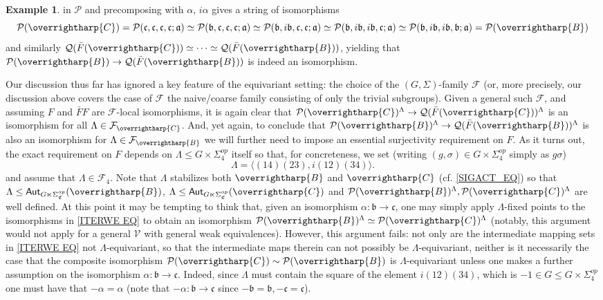 \documentclass[a4paper,10pt
,draft
]{article}%
\numberwithin{equation}{section}
\numberwithin{figure}{section}
\theoremstyle{definition} %
\newtheorem{example}[equation]{Example}%
\newcommand{\vect}[1]{\text{\overrightharp{\ensuremath{#1}}}}
\newcommand{\F}{\ensuremath{\mathcal F}}
\newcommand{\V}{\ensuremath{\mathcal V}}
\renewcommand{\P}{\ensuremath{\mathcal P}}
\newcommand{\1}{\ensuremath{\mathbbm 1}}%
\begin{document}
\begin{example}
in $\P$ and precomposing  
with $\alpha$, $i \alpha$ gives a string of isomorphisms
\begin{equation}\label{ITERWE EQ}
\P(\vect{C})
=
\P(\mathfrak{c},\mathfrak{c},\mathfrak{c},\mathfrak{c};\mathfrak{a})
\simeq 
\P(\mathfrak{b},\mathfrak{c},\mathfrak{c},\mathfrak{c};\mathfrak{a})
\simeq
\P(\mathfrak{b},i\mathfrak{b},\mathfrak{c},\mathfrak{c};\mathfrak{a})
\simeq
\P(\mathfrak{b},i\mathfrak{b},i\mathfrak{b},\mathfrak{c};\mathfrak{a})
\simeq
\P(\mathfrak{b},i\mathfrak{b},i\mathfrak{b},\mathfrak{b};\mathfrak{a})
=
\P(\vect{B})
\end{equation}
and similarly
$\mathcal{Q}(\bar{F}(\vect{C})) 
\simeq
\cdots 
\simeq
\mathcal{Q}(\bar{F}(\vect{B}))
$,
yielding that
$\P(\vect{B}) \to \mathcal{Q}(\bar{F}(\vect{B}))$
is indeed an isomorphism.

Our discussion thus far has ignored a key feature of the equivariant setting: the choice of the $(G,\Sigma)$-family $\F$
(or, more precisely, our discussion above covers the case of $\F$ the naive/coarse family consisting of only the trivial subgroups).
Given a general such $\F$, 
and assuming $F$ and $\bar{F} F$ are $\F$-local isomorphisms,
it is again clear that
$\P(\vect{C})^{\Lambda} \to \mathcal{Q}(\bar{F}(\vect{C}))^{\Lambda}$
is an isomorphism for all $\Lambda \in \F_{\vect{C}}$.
And, yet again, to conclude that
$\P(\vect{B})^{\Lambda} \to \mathcal{Q}(\bar{F}(\vect{B}))^{\Lambda}$
is also an isomorphism for $\Lambda \in \F_{\vect{B}}$ we will further need to impose an essential surjectivity requirement on $F$.
As it turns out, the exact requirement on $F$ depends on 
$\Lambda \leq G \times \Sigma_4^{op}$ itself so that, for concreteness, we set (writing $(g,\sigma) \in G \times \Sigma_4^{op}$ simply as $g\sigma$)
\[
\Lambda = \langle (14)(23), i (12)(34) \rangle.
\]
and assume that $\Lambda \in \F_4$.
Note that $\Lambda$ stabilizes both 
$\vect{B}$ and $\vect{C}$
(cf. \eqref{SIGACT_EQ})
so that 
$\Lambda \leq \mathsf{Aut}_{G \ltimes \Sigma^{op}_{\mathfrak{C}}}(\vect{B})$,
$\Lambda \leq \mathsf{Aut}_{G \ltimes \Sigma^{op}_{\mathfrak{C}}}(\vect{C})$
and $\P(\vect{B})^{\Lambda}, \P(\vect{C})^{\Lambda}$
are well defined.
At this point it may be tempting to think that, 
given an isomorphism 
$\alpha \colon \mathfrak{b} \to \mathfrak{c}$,
one may simply apply $\Lambda$-fixed points 
to the isomorphisms in \eqref{ITERWE EQ}
to obtain an isomorphism 
$\P(\vect{B})^{\Lambda} \simeq \P(\vect{C})^{\Lambda}$
(notably, this argument would not apply for a general $\V$
with general weak equivalences).
%
However, this argument fails: not only are the intermediate mapping sets
in \eqref{ITERWE EQ} not $\Lambda$-equivariant, so that the intermediate maps therein can not possibly be $\Lambda$-equivariant,
neither is it necessarily the case that the composite isomorphism
$\P(\vect{C}) \sim \P(\vect{B})$ is $\Lambda$-equivariant
unless one makes a further assumption on the isomorphism
$\alpha\colon \mathfrak{b} \to \mathfrak{c}$.
Indeed, since $\Lambda$
must contain the square of the element $i(12)(34)$,
which is $-1 \in G \leq G \times \Sigma_4^{op}$
one must have that 
$-\alpha =\alpha$
(note that $-\alpha \colon \mathfrak{b} \to \mathfrak{c}$
since $-\mathfrak{b}=\mathfrak{b},-\mathfrak{c}=\mathfrak{c}$).


\end{example}
\end{document}
